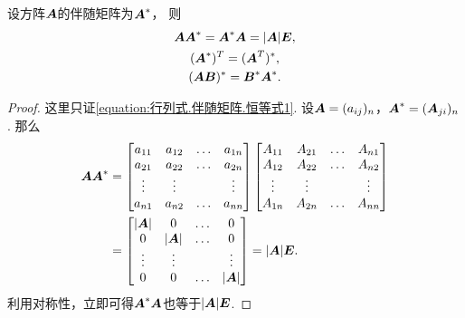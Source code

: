 \begin{theorem}
设方阵\(\boldsymbol{A}\)的伴随矩阵为\(\boldsymbol{A}^*\)，
则\begin{gather}
	\boldsymbol{A} \boldsymbol{A}^* = \boldsymbol{A}^* \boldsymbol{A} = \abs{\boldsymbol{A}} \boldsymbol{E}, \label{equation:行列式.伴随矩阵.恒等式1} \\
	(\boldsymbol{A}^*)^T = (\boldsymbol{A}^T)^*, \label{equation:行列式.伴随矩阵.恒等式2} \\
	(\boldsymbol{A} \boldsymbol{B})^* = \boldsymbol{B}^* \boldsymbol{A}^*. \label{equation:行列式.伴随矩阵.恒等式3}
\end{gather}
\begin{proof}
这里只证\cref{equation:行列式.伴随矩阵.恒等式1}.
设\(\boldsymbol{A}=(a_{ij})_n\)，\(\boldsymbol{A}^*=(\boldsymbol{A}_{ji})_n\).
那么\begin{align*}
	\boldsymbol{A}\boldsymbol{A}^*
	&= \begin{bmatrix}
		a_{11} & a_{12} & \dots & a_{1n} \\
		a_{21} & a_{22} & \dots & a_{2n} \\
		\vdots & \vdots & & \vdots \\
		a_{n1} & a_{n2} & \dots & a_{nn} \\
	\end{bmatrix}
	\begin{bmatrix}
		A_{11} & A_{21} & \dots & A_{n1} \\
		A_{12} & A_{22} & \dots & A_{n2} \\
		\vdots & \vdots & & \vdots \\
		A_{1n} & A_{2n} & \dots & A_{nn}
	\end{bmatrix} \\
	&= \begin{bmatrix}
		\abs{\boldsymbol{A}} & 0 & \dots & 0 \\
		0 & \abs{\boldsymbol{A}} & \dots & 0 \\
		\vdots & \vdots & & \vdots \\
		0 & 0 & \dots & \abs{\boldsymbol{A}}
	\end{bmatrix}
	= \abs{\boldsymbol{A}} \boldsymbol{E}.
\end{align*}
利用对称性，立即可得\(\boldsymbol{A}^*\boldsymbol{A}\)也等于\(\abs{\boldsymbol{A}} \boldsymbol{E}\).
\end{proof}
\end{theorem}

